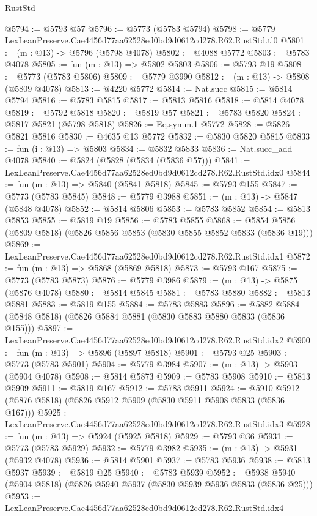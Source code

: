 \begin{lexlean}{RustStd}
\begin{coremodule}
@5794 := @5793 @57
@5796 := @5773 (@5783 @5794)
@5798 := @5779 LexLeanPreserve.Cae4456d77aa62528ed0bd9d0612cd278.R62.RustStd.tl0
@5801 := (m : @13) -> @5796 (@5798 @4078)
@5802 := @4088 @5772
@5803 := @5783 @4078
@5805 := fun (m : @13) => @5802 @5803
@5806 := @5793 @19
@5808 := @5773 (@5783 @5806)
@5809 := @5779 @3990
@5812 := (m : @13) -> @5808 (@5809 @4078)
@5813 := @4220 @5772
@5814 := Nat.succ
@5815 := @5814 @5794
@5816 := @5783 @5815
@5817 := @5813 @5816
@5818 := @5814 @4078
@5819 := @5792 @5818
@5820 := @5819 @57
@5821 := @5783 @5820
@5824 := @5817 @5821 (@5798 @5818)
@5826 := Eq.symm.{1} @5772
@5828 := @5826 @5821 @5816
@5830 := @4635 @13 @5772
@5832 := @5830 @5820 @5815
@5833 := fun (i : @13) => @5803
@5834 := @5832 @5833
@5836 := Nat.succ_add @4078
@5840 := @5824 (@5828 (@5834 (@5836 @57)))
@5841 := LexLeanPreserve.Cae4456d77aa62528ed0bd9d0612cd278.R62.RustStd.idx0
@5844 := fun (m : @13) => @5840 (@5841 @5818)
@5845 := @5793 @155
@5847 := @5773 (@5783 @5845)
@5848 := @5779 @3988
@5851 := (m : @13) -> @5847 (@5848 @4078)
@5852 := @5814 @5806
@5853 := @5783 @5852
@5854 := @5813 @5853
@5855 := @5819 @19
@5856 := @5783 @5855
@5868 := @5854 @5856 (@5809 @5818) (@5826 @5856 @5853 (@5830 @5855 @5852 @5833 (@5836 @19)))
@5869 := LexLeanPreserve.Cae4456d77aa62528ed0bd9d0612cd278.R62.RustStd.idx1
@5872 := fun (m : @13) => @5868 (@5869 @5818)
@5873 := @5793 @167
@5875 := @5773 (@5783 @5873)
@5876 := @5779 @3986
@5879 := (m : @13) -> @5875 (@5876 @4078)
@5880 := @5814 @5845
@5881 := @5783 @5880
@5882 := @5813 @5881
@5883 := @5819 @155
@5884 := @5783 @5883
@5896 := @5882 @5884 (@5848 @5818) (@5826 @5884 @5881 (@5830 @5883 @5880 @5833 (@5836 @155)))
@5897 := LexLeanPreserve.Cae4456d77aa62528ed0bd9d0612cd278.R62.RustStd.idx2
@5900 := fun (m : @13) => @5896 (@5897 @5818)
@5901 := @5793 @25
@5903 := @5773 (@5783 @5901)
@5904 := @5779 @3984
@5907 := (m : @13) -> @5903 (@5904 @4078)
@5908 := @5814 @5873
@5909 := @5783 @5908
@5910 := @5813 @5909
@5911 := @5819 @167
@5912 := @5783 @5911
@5924 := @5910 @5912 (@5876 @5818) (@5826 @5912 @5909 (@5830 @5911 @5908 @5833 (@5836 @167)))
@5925 := LexLeanPreserve.Cae4456d77aa62528ed0bd9d0612cd278.R62.RustStd.idx3
@5928 := fun (m : @13) => @5924 (@5925 @5818)
@5929 := @5793 @36
@5931 := @5773 (@5783 @5929)
@5932 := @5779 @3982
@5935 := (m : @13) -> @5931 (@5932 @4078)
@5936 := @5814 @5901
@5937 := @5783 @5936
@5938 := @5813 @5937
@5939 := @5819 @25
@5940 := @5783 @5939
@5952 := @5938 @5940 (@5904 @5818) (@5826 @5940 @5937 (@5830 @5939 @5936 @5833 (@5836 @25)))
@5953 := LexLeanPreserve.Cae4456d77aa62528ed0bd9d0612cd278.R62.RustStd.idx4

\end{coremodule}
\end{lexlean}
